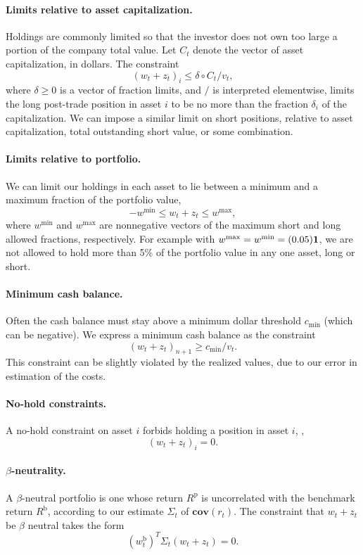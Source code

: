 \documentclass[openany]{article}  %
\newcommand{\cov}{\mathbf{cov}}
\newcommand{\Rp}{R^\mathrm{p}}
\newcommand{\Rb}{R^\mathrm{b}}
\begin{document}
\paragraph{Limits relative to asset capitalization.}
Holdings are commonly limited so that the investor does not own
too large a portion of the company total value.
Let $C_t$ denote the vector of asset capitalization, in dollars.
The constraint
\[
(w_t + z_t)_i \leq \delta \circ C_t/v_t,
\]
where $\delta \geq 0$ is a vector of fraction limits, and $/$ is
interpreted elementwise,
limits the long post-trade position
in asset $i$ to be no more than the fraction $\delta_i$ of the capitalization.
We can impose a similar limit on short positions, relative to
asset capitalization, total outstanding short value, or some combination.

\paragraph{Limits relative to portfolio.}
We can limit our holdings in each asset to lie between a minimum and
a maximum fraction of the portfolio value,
\[
-w^\mathrm{min} \leq w_t+z_t \leq w^\mathrm{max},
\]
where $w^\mathrm{min}$ and $w^\mathrm{max}$ are nonnegative
vectors of the maximum short and long allowed fractions, respectively.
For example with $w^\mathrm{max}=w^\mathrm{min} = (0.05) \mathbf 1$,
we are not allowed to hold more than 5\% of the portfolio value in any
one asset, long or short.

\paragraph{Minimum cash balance.}
Often the cash balance must stay above a minimum dollar threshold $c_\mathrm{min}$
(which can be negative).
We express a minimum cash balance as the constraint
\[
(w_t + z_t)_{n+1} \geq c_\mathrm{min}/v_t.
\]
This constraint can be slightly violated by the realized values, due to
our error in estimation of the costs.

\paragraph{No-hold constraints.}
A no-hold constraint on asset $i$ forbids holding a position in asset $i$,
\ie,
\[
(w_t + z_t)_i = 0.
\]

\paragraph{$\beta$-neutrality.}
A $\beta$-neutral portfolio is one whose return $\Rp$
is uncorrelated with the benchmark return $\Rb$, according to our
estimate $\Sigma_t$ of $\cov(r_t)$.
The constraint that $w_t + z_t$ be $\beta$ neutral takes the form
\[
(w^\mathrm{b}_t)^T \Sigma_t (w_t + z_t) = 0.
\]
\end{document}
